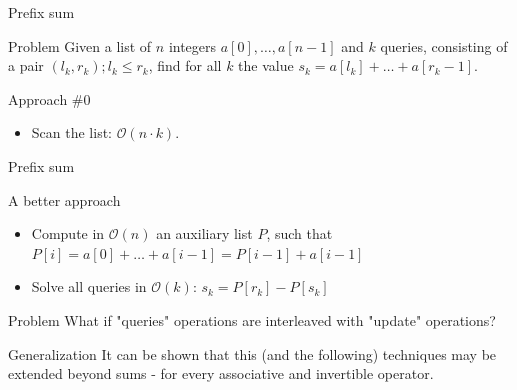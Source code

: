 \documentclass{beamer}
\begin{document}
\begin{frame}{Prefix sum}
\begin{block}{Problem}
Given a list of $n$ integers $a[0], \dots, a[n-1]$ and $k$ queries, consisting of a pair $(l_k, r_k); l_k \leq r_k$, find for all $k$ the value $s_k = a[l_k] + \dots + a[r_k-1]$.
\end{block}
\begin{block}{Approach \#0}
\begin{itemize}
\item Scan the list: $\mathcal{O}(n \cdot k)$.
\end{itemize}
\end{block}
\end{frame}

\begin{frame}{Prefix sum}
\begin{block}{A better approach}
\begin{itemize}
\item Compute in $\mathcal{O}(n)$ an auxiliary list $P$, such that $P[i] = a[0] + \dots + a[i-1] = P[i-1] + a[i-1]$
\item Solve all queries in $\mathcal{O}(k)$: $s_k = P[r_k] - P[s_k]$ 
\end{itemize}
\end{block}
\begin{block}{Problem}
What if "queries" operations are interleaved with "update" operations?
\end{block}
\begin{block}{Generalization}
It can be shown that this (and the following) techniques may be extended beyond sums - for every associative and invertible operator.
\end{block}
\end{frame}
\end{document}
